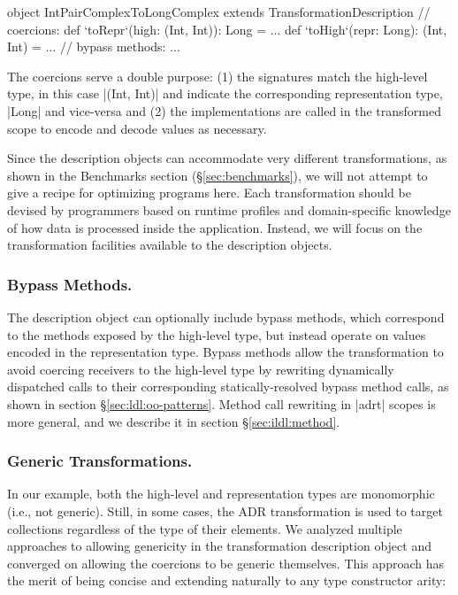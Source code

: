 \begin{lstlisting-nobreak}
object IntPairComplexToLongComplex
          extends TransformationDescription {
  // coercions:
  def `toRepr`(high: (Int, Int)): Long = ...
  def `toHigh`(repr: Long): (Int, Int) = ...
  // bypass methods:
  ...
}
\end{lstlisting-nobreak}

The coercions serve a double purpose: (1) the signatures match the high-level type, in this case |(Int, Int)| and indicate the corresponding representation type, |Long| and vice-versa and (2) the implementations are called in the transformed scope to encode and decode values as necessary.

Since the description objects can accommodate very different transformations, as shown in the Benchmarks section (\S\ref{sec:benchmarks}), we will not attempt to give a recipe for optimizing programs here. Each transformation should be devised by programmers based on runtime profiles and domain-specific knowledge of how data is processed inside the application. Instead, we will focus on the transformation facilities available to the description objects.

\subsubsection{Bypass Methods.} The description object can optionally include bypass methods, which correspond to the methods exposed by the high-level type, but instead operate on values encoded in the representation type. Bypass methods allow the transformation to avoid coercing receivers to the high-level type by rewriting dynamically dispatched calls to their corresponding statically-resolved bypass method calls, as shown in section \S\ref{sec:ldl:oo-patterns}. Method call rewriting in |adrt| scopes is more general, and we describe it   in section \S\ref{sec:ildl:method}.

\vspace{0.4em}
\subsubsection{Generic Transformations.} In our example, both the high-level and representation types are monomorphic (i.e., not generic). Still, in some cases, the ADR transformation is used to target collections regardless of the type of their elements. We analyzed multiple approaches to allowing genericity in the transformation description object and converged on allowing the coercions to be generic themselves. This approach has the merit of being concise and extending naturally to any type constructor arity:

